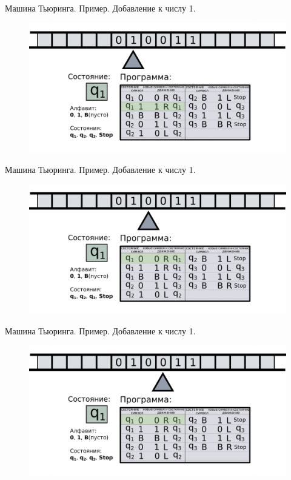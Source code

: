 \documentclass[newPxFont]{beamer}
\begin{document}
\begin{frame}{Машина Тьюринга. Пример. Добавление к числу 1.}
	\begin{figure}
		\centerline{\includegraphics[width=1.5\linewidth]{images/tm_ex_3.png}}
	\end{figure}
\end{frame}

\begin{frame}{Машина Тьюринга. Пример. Добавление к числу 1.}
	\begin{figure}
		\centerline{\includegraphics[width=1.5\linewidth]{images/tm_ex_4.png}}
	\end{figure}
\end{frame}

\begin{frame}{Машина Тьюринга. Пример. Добавление к числу 1.}
	\begin{figure}
		\centerline{\includegraphics[width=1.5\linewidth]{images/tm_ex_5.png}}
	\end{figure}
\end{frame}
\end{document}
